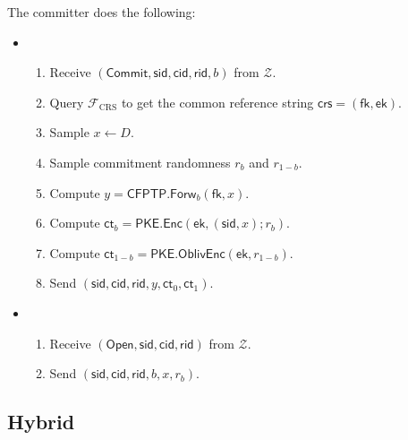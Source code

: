\documentclass[11pt,letterpaper]{article}
\theoremstyle{plain} %
\theoremstyle{definition} %
\theoremstyle{remark} %
\newcommand{\OpenMsg}{\mathsf{Open}}
\newcommand{\CommitMsg}{\mathsf{Commit}}
\newcommand{\Input}{x}
\newcommand{\PKE}{\mathsf{PKE}}
\newcommand{\Enc}{\mathsf{Enc}}
\newcommand{\OblivEnc}{\mathsf{OblivEnc}}
\newcommand{\EncKey}{\mathsf{ek}}
\newcommand{\Ct}{\mathsf{ct}}
\newcommand{\Rand}{r}
\newcommand{\CFPTP}{\mathsf{CFPTP}}
\newcommand{\Forw}{\mathsf{Forw}}
\newcommand{\ForwKey}{\mathsf{fk}}
\newcommand{\Domain}{D}
\newcommand{\Output}{y}
\newcommand{\Environment}{{\mathcal{Z}}} %
\newcommand{\IF}{\mathcal{F}} %
\newcommand{\sid}{\mathsf{sid}}
\newcommand{\CommitterId}{\mathsf{cid}}
\newcommand{\ReceiverId}{\mathsf{rid}}
\newcommand{\IFCrs}{\IF_{\mathrm{CRS}}}
\newcommand{\crs}{\mathsf{crs}}
\newcommand{\CommBit}{b}
\begin{document}
The committer does the following:
\begin{itemize}
\item {}
\begin{enumerate}[nolistsep]
	\item Receive $(\CommitMsg,\sid,\CommitterId,\ReceiverId,\CommBit)$ from $\Environment$.
	\item Query $\IFCrs$ to get the common reference string $\crs = (\ForwKey, \EncKey)$.
	\item Sample $\Input \gets \Domain$.
	\item Sample commitment randomness $\Rand_{\CommBit}$ and $\Rand_{1-\CommBit}$.
	\item Compute $\Output = \CFPTP.\Forw_{\CommBit}(\ForwKey,\Input)$.
	\item Compute $\Ct_{\CommBit} = \PKE.\Enc(\EncKey, (\sid,\Input); \Rand_\CommBit)$.
	\item Compute $\Ct_{1-\CommBit} = \PKE.\OblivEnc(\EncKey, \Rand_{1-\CommBit})$.
	\item Send $(\sid,\CommitterId,\ReceiverId,\Output, \Ct_0, \Ct_1)$.
\end{enumerate}

\item {}
\begin{enumerate}[nolistsep]
    \item Receive $(\OpenMsg,\sid,\CommitterId,\ReceiverId)$ from $\Environment$.
    \item Send $(\sid,\CommitterId,\ReceiverId,\CommBit, \Input, \Rand_{\CommBit})$.
\end{enumerate}
\end{itemize}

\subsection{Hybrid}
\label{sec:hyb-distr}
\end{document}
